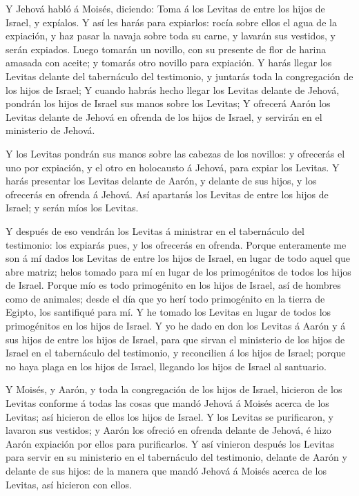  Y Jehová habló á Moisés, diciendo:  Toma á los
Levitas de entre los hijos de Israel, y expíalos.  Y así les
harás para expiarlos: rocía sobre ellos el agua de la expiación, y haz
pasar la navaja sobre toda su carne, y lavarán sus vestidos, y serán
expiados.  Luego tomarán un novillo, con su presente de flor
de harina amasada con aceite; y tomarás otro novillo para expiación.
 Y harás llegar los Levitas delante del tabernáculo del
testimonio, y juntarás toda la congregación de los hijos de Israel;
 Y cuando habrás hecho llegar los Levitas delante de
Jehová, pondrán los hijos de Israel sus manos sobre los Levitas;
 Y ofrecerá Aarón los Levitas delante de Jehová en ofrenda
de los hijos de Israel, y servirán en el ministerio de Jehová.

 Y los Levitas pondrán sus manos sobre las cabezas de los
novillos: y ofrecerás el uno por expiación, y el otro en holocausto á
Jehová, para expiar los Levitas.  Y harás presentar los
Levitas delante de Aarón, y delante de sus hijos, y los ofrecerás en
ofrenda á Jehová.  Así apartarás los Levitas de entre los
hijos de Israel; y serán míos los Levitas.

 Y después de eso vendrán los Levitas á ministrar en el
tabernáculo del testimonio: los expiarás pues, y los ofrecerás en
ofrenda.  Porque enteramente me son á mí dados los Levitas
de entre los hijos de Israel, en lugar de todo aquel que abre matriz;
helos tomado para mí en lugar de los primogénitos de todos los hijos de
Israel.  Porque mío es todo primogénito en los hijos de
Israel, así de hombres como de animales; desde el día que yo herí todo
primogénito en la tierra de Egipto, los santifiqué para mí.
 Y he tomado los Levitas en lugar de todos los primogénitos
en los hijos de Israel.  Y yo he dado en don los Levitas á
Aarón y á sus hijos de entre los hijos de Israel, para que sirvan el
ministerio de los hijos de Israel en el tabernáculo del testimonio, y
reconcilien á los hijos de Israel; porque no haya plaga en los hijos de
Israel, llegando los hijos de Israel al santuario.

 Y Moisés, y Aarón, y toda la congregación de los hijos de
Israel, hicieron de los Levitas conforme á todas las cosas que mandó
Jehová á Moisés acerca de los Levitas; así hicieron de ellos los hijos
de Israel.  Y los Levitas se purificaron, y lavaron sus
vestidos; y Aarón los ofreció en ofrenda delante de Jehová, é hizo Aarón
expiación por ellos para purificarlos.  Y así vinieron
después los Levitas para servir en su ministerio en el tabernáculo del
testimonio, delante de Aarón y delante de sus hijos: de la manera que
mandó Jehová á Moisés acerca de los Levitas, así hicieron con ellos.

